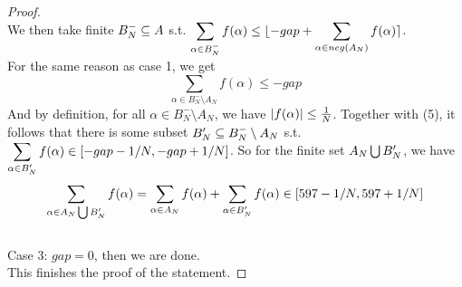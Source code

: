 \documentclass[lang=cn,11pt]{elegantbook}
\begin{document}
\begin{proof}
\\ We then take finite $B_N^- \subseteq A$ s.t. $\displaystyle \sum_{\alpha \in B_N^-} f(\alpha) \leq \lfloor -gap + \sum_{\alpha \in neg(A_N)} f(\alpha) \rceil$.\\
For the same reason as case 1, we get 
\begin{equation}
     \sum_{\alpha \in B_N^- \setminus A_N} f(\alpha) \leq -gap 
\end{equation}
And by definition, for all $\alpha \in B_N^- \setminus A_N$, we have $|f(\alpha)|\leq {1\over N}$. Together with (5), it follows that there is some subset $B_N' \subseteq B_N^- \setminus A_N$ s.t. $\displaystyle \sum_{\alpha \in B_N'} f(\alpha) \in [-gap-1/N, -gap+1/N]$. So for the finite set $A_N \bigcup B_N'$, we have 
\begin{equation}
    \sum_{\alpha \in A_N \bigcup B_N'}f(\alpha) = \sum_{\alpha \in A_N}f(\alpha) + \sum_{\alpha \in  B_N'}f(\alpha) \in [597-1/N, 597+1/N]
\end{equation}\\
Case 3: $gap = 0$, then we are done.\\
This finishes the proof of the statement.
\end{proof}
\end{document}
